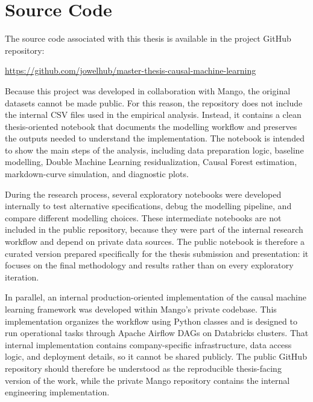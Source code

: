 
\chapter{Source Code}

\label{AppendixB}

The source code associated with this thesis is available in the project GitHub repository:

\begin{center}
\url{https://github.com/jowelhub/master-thesis-causal-machine-learning}
\end{center}

Because this project was developed in collaboration with Mango, the original datasets cannot be made public. For this reason, the repository does not include the internal CSV files used in the empirical analysis. Instead, it contains a clean thesis-oriented notebook that documents the modelling workflow and preserves the outputs needed to understand the implementation. The notebook is intended to show the main steps of the analysis, including data preparation logic, baseline modelling, Double Machine Learning residualization, Causal Forest estimation, markdown-curve simulation, and diagnostic plots.

During the research process, several exploratory notebooks were developed internally to test alternative specifications, debug the modelling pipeline, and compare different modelling choices. These intermediate notebooks are not included in the public repository, because they were part of the internal research workflow and depend on private data sources. The public notebook is therefore a curated version prepared specifically for the thesis submission and presentation: it focuses on the final methodology and results rather than on every exploratory iteration.

In parallel, an internal production-oriented implementation of the causal machine learning framework was developed within Mango's private codebase. This implementation organizes the workflow using Python classes and is designed to run operational tasks through Apache Airflow DAGs on Databricks clusters. That internal implementation contains company-specific infrastructure, data access logic, and deployment details, so it cannot be shared publicly. The public GitHub repository should therefore be understood as the reproducible thesis-facing version of the work, while the private Mango repository contains the internal engineering implementation.